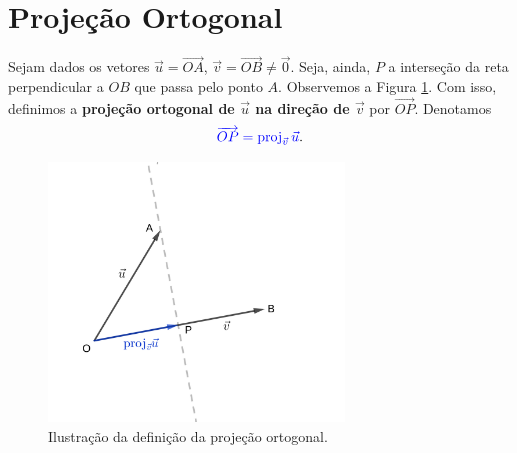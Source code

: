 \section{Projeção Ortogonal}\label{cap_produtos_sec_proj}
\badgeRevisar

Sejam dados os vetores $\vec{u}=\overrightarrow{OA}$, $\vec{v}=\overrightarrow{OB}\neq\vec{0}$. Seja, ainda, $P$ a interseção da reta perpendicular a $OB$ que passa pelo ponto $A$. Observemos a Figura \ref{fig:proj}. Com isso, definimos a {\bf projeção ortogonal de $\vec{u}$ na direção de $\vec{v}$}  por $\overrightarrow{OP}$. Denotamos
\begin{equation}
  {\color{blue}\overrightarrow{OP} = \operatorname{proj}_{\vec{v}}\vec{u}}.
\end{equation}

\begin{figure}[H]
  \centering
  \includegraphics[width=0.7\textwidth]{./cap_produtos/dados/fig_proj/fig_proj}
  \caption{Ilustração da definição da projeção ortogonal.}
  \label{fig:proj}
\end{figure}

